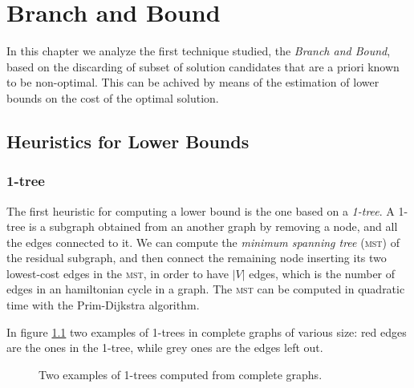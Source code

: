 \chapter{Branch and Bound}
In this chapter we analyze the first technique studied, the \textit{Branch and Bound}, based on the discarding of subset of solution candidates that are a priori known to be non-optimal. This can be achived by means of the estimation of lower bounds on the cost of the optimal solution.

\section{Heuristics for Lower Bounds}
\subsection{1-tree}
The first heuristic for computing a lower bound is the one based on a \textit{1-tree}. A 1-tree is a subgraph obtained from an another graph by removing a node, and all the edges connected to it. We can compute the \textit{minimum spanning tree} (\textsc{mst}) of the residual subgraph, and then connect the remaining node inserting its two lowest-cost edges in the \textsc{mst}, in order to have $|V|$ edges, which is the number of edges in an hamiltonian cycle in a graph. The \textsc{mst} can be computed in quadratic time with the Prim-Dijkstra algorithm.

In figure \ref{fig:1trees} two examples of 1-trees in complete graphs of various size: red edges are the ones in the 1-tree, while grey ones are the edges left out.

\begin{figure}[hbtp]
  \centering
   \quad
  \caption{Two examples of 1-trees computed from complete graphs.}
  \label{fig:1trees}
\end{figure}

